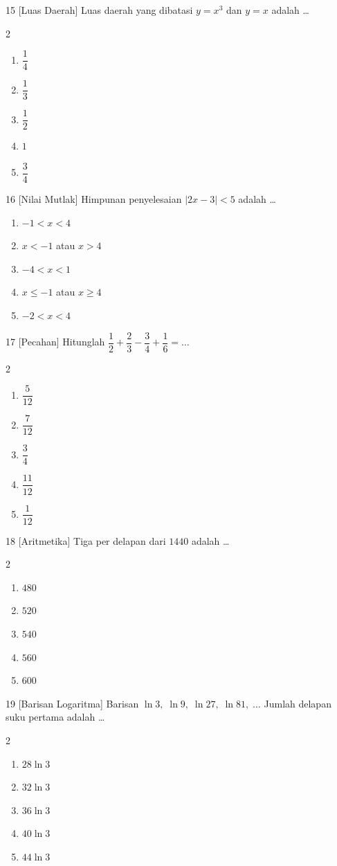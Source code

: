 \documentclass[11pt]{article}
\newenvironment{pil}{%
  \begin{enumerate}[label=(\alph*),leftmargin=*,itemsep=1pt,topsep=3pt]}%
  {\end{enumerate}}
\newenvironment{pilB}{%
  \par\smallskip\begin{multicols}{2}
  \begin{enumerate}[label=(\alph*),leftmargin=*,itemsep=1pt,topsep=3pt]}%
  {\end{enumerate}\end{multicols}}
\begin{document}
\begin{soal}{15 \normalfont\small[Luas Daerah]}
Luas daerah yang dibatasi $y=x^3$ dan $y=x$ adalah \ldots
\begin{pilB}
  \item $\dfrac14$ \item $\dfrac13$ \item $\dfrac12$ \item $1$ \item $\dfrac34$
\end{pilB}
\end{soal}

\begin{soal}{16 \normalfont\small[Nilai Mutlak]}
Himpunan penyelesaian $|2x-3|<5$ adalah \ldots
\begin{pil}
  \item $-1<x<4$ \item $x<-1$ atau $x>4$
  \item $-4<x<1$ \item $x\leq-1$ atau $x\geq4$ \item $-2<x<4$
\end{pil}
\end{soal}

\begin{soal}{17 \normalfont\small[Pecahan]}
Hitunglah $\dfrac12+\dfrac23-\dfrac34+\dfrac16=\ldots$
\begin{pilB}
  \item $\dfrac{5}{12}$ \item $\dfrac{7}{12}$ \item $\dfrac34$ \item $\dfrac{11}{12}$ \item $\dfrac{1}{12}$
\end{pilB}
\end{soal}

\begin{soal}{18 \normalfont\small[Aritmetika]}
Tiga per delapan dari $1440$ adalah \ldots
\begin{pilB}
  \item $480$ \item $520$ \item $540$ \item $560$ \item $600$
\end{pilB}
\end{soal}

\begin{soal}{19 \normalfont\small[Barisan Logaritma]}
Barisan $\ln3,\;\ln9,\;\ln27,\;\ln81,\;\ldots$ Jumlah delapan suku pertama adalah \ldots
\begin{pilB}
  \item $28\ln3$ \item $32\ln3$ \item $36\ln3$ \item $40\ln3$ \item $44\ln3$
\end{pilB}
\end{soal}
\end{document}
